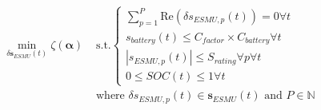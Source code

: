 \begin{equation}
\begin{split}
	\min_{\delta \textbf{s}_{ESMU}(t)} \zeta(\boldsymbol{\alpha})
	&\text{ s.t.}
	\begin{cases}
		\sum_{p=1}^{P} \text{Re} \left(\delta s_{ESMU,p}(t)\right) = 0 \forall t\\
		s_{battery}(t) \leq C_{factor}\times C_{battery} \forall t\\
		\left|s_{ESMU,p}(t)\right| \leq S_{rating} \forall p \forall t\\
		0 \leq SOC(t) \leq 1 \forall t
	\end{cases}\\
	&\text{ where } \delta s_{ESMU,p}(t) \in \textbf{s}_{ESMU}(t) \text{ and } P \in \mathbb{N}
\end{split}
\label{ch1:equ:closed-loop-minimisation}
\end{equation}
